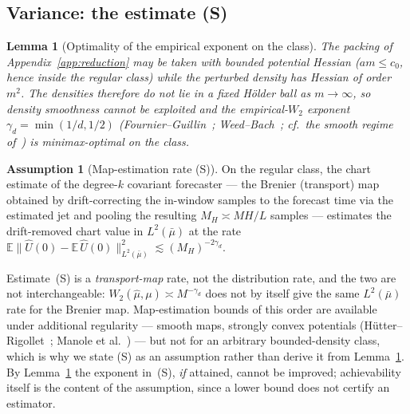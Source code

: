 \documentclass[11pt]{article}
\newtheorem{lemma}{Lemma}
\theoremstyle{definition}
\newtheorem{assumption}{Assumption}
\theoremstyle{remark}
\newcommand{\E}{\mathbb{E}}
\begin{document}
\subsection{Variance: the estimate (S)}\label{ssec:covvar}
\begin{lemma}[Optimality of the empirical exponent on the class]\label{lem:gammaopt}
The packing of Appendix~\ref{app:reduction} may be taken with bounded potential Hessian
($am\le c_0$, hence inside the regular class) while the perturbed density has Hessian of order
$m^{2}$. The densities therefore do not lie in a fixed H\"older ball as $m\to\infty$, so density
smoothness cannot be exploited and the empirical-$W_2$ exponent $\gamma_d=\min(1/d,1/2)$
(Fournier--Guillin~\cite{fg}; Weed--Bach~\cite{weedbach}; cf.\ the smooth regime of~\cite{nwb}) is
minimax-optimal on the class.
\end{lemma}
\begin{assumption}[Map-estimation rate (S)]\label{ass:S}
On the regular class, the chart estimate of the degree-$k$ covariant forecaster --- the Brenier
(transport) map obtained by drift-correcting the in-window samples to the forecast time via the
estimated jet and pooling the resulting $M_H\asymp MH/L$ samples --- estimates the drift-removed chart
value in $L^2(\bar\mu)$ at the rate
$\E\|\widehat U(0)-\E\,\widehat U(0)\|_{L^2(\bar\mu)}^2\lesssim(M_H)^{-2\gamma_d}$.
\end{assumption}

\noindent Estimate~(S) is a \emph{transport-map} rate, not the distribution rate, and the two are not
interchangeable: $W_2(\widehat\mu,\mu)\asymp M^{-\gamma_d}$ does not by itself give the same
$L^2(\bar\mu)$ rate for the Brenier map. Map-estimation bounds of this order are available under
additional regularity --- smooth maps, strongly convex potentials (H\"utter--Rigollet~\cite{hutter};
Manole et al.~\cite{manole}) --- but not for an arbitrary bounded-density class, which is why we state
(S) as an assumption rather than derive it from Lemma~\ref{lem:gammaopt}. By Lemma~\ref{lem:gammaopt}
the exponent in~(S), \emph{if} attained, cannot be improved; achievability itself is the content of
the assumption, since a lower bound does not certify an estimator.
\end{document}
